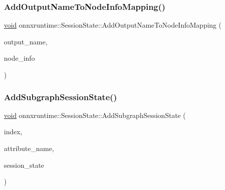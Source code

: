 \mbox{\label{classonnxruntime_1_1SessionState_a7f263156b095ec3edb1d5956adc4903d}} 
\subsubsection{\texorpdfstring{Add\+Output\+Name\+To\+Node\+Info\+Mapping()}{AddOutputNameToNodeInfoMapping()}}
{\footnotesize\ttfamily \mbox{\hyperlink{mlasi_8h_a88f941d423cb2a819b70a1358982b1a6}{void}} onnxruntime\+::\+Session\+State\+::\+Add\+Output\+Name\+To\+Node\+Info\+Mapping (\begin{DoxyParamCaption}\item[{const std\+::string \&}]{output\+\_\+name,  }\item[{const \mbox{\hyperlink{structonnxruntime_1_1SessionState_1_1NodeInfo}{Node\+Info}} \&}]{node\+\_\+info }\end{DoxyParamCaption})}

\mbox{\label{classonnxruntime_1_1SessionState_ab47ad35c3d00dff1aab587b2bd1cb737}} 
\subsubsection{\texorpdfstring{Add\+Subgraph\+Session\+State()}{AddSubgraphSessionState()}}
{\footnotesize\ttfamily \mbox{\hyperlink{mlasi_8h_a88f941d423cb2a819b70a1358982b1a6}{void}} onnxruntime\+::\+Session\+State\+::\+Add\+Subgraph\+Session\+State (\begin{DoxyParamCaption}\item[{\mbox{\hyperlink{namespaceonnxruntime_af8773b5c12b5d8fd9292eb2e268df760}{onnxruntime\+::\+Node\+Index}}}]{index,  }\item[{const std\+::string \&}]{attribute\+\_\+name,  }\item[{const \mbox{\hyperlink{classonnxruntime_1_1SessionState}{Session\+State}} \&}]{session\+\_\+state }\end{DoxyParamCaption})}

